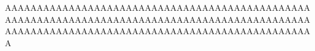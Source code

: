 \documentclass{article}
\begin{document}
AAAAAAAAAAAAAAAAAAAAAAAAAAAAAAAAAAAAAAAAAAAAAAAAAAAAAAAAAAAAAAAAAAAAAAAAAAAAAAAAAAAAAAAAAAAAAAAAAAAAAAAAAAAAAAAAAAAAAAAAAAAAAAAAAAAAAAAAAAAAAAAAA
\end{document}
